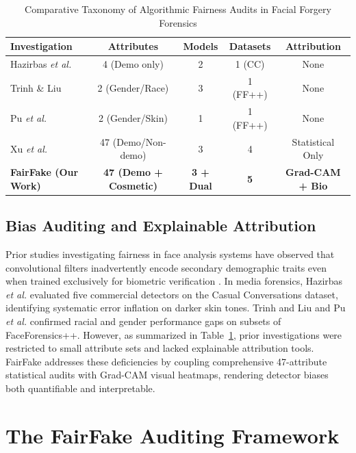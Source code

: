 \documentclass[journal]{IEEEtran}
\begin{document}
\begin{table}[t]
\caption{Comparative Taxonomy of Algorithmic Fairness Audits in Facial Forgery Forensics}
\label{tab:comparison_bias}
\centering
\renewcommand{\arraystretch}{1.2}
\setlength{\tabcolsep}{5pt}
\begin{tabular}{lcccc}
\toprule
\textbf{Investigation} & \textbf{Attributes} & \textbf{Models} & \textbf{Datasets} & \textbf{Attribution} \\
\midrule
Hazirbas \textit{et al.} \cite{hazirbas2022towards} & 4 (Demo only) & 2 & 1 (CC) & None \\
Trinh \& Liu \cite{trinh2021examination} & 2 (Gender/Race) & 3 & 1 (FF++) & None \\
Pu \textit{et al.} \cite{pu2022fairness} & 2 (Gender/Skin) & 1 & 1 (FF++) & None \\
Xu \textit{et al.} \cite{xu2024analyzing} & 47 (Demo/Non-demo) & 3 & 4 & Statistical Only \\
\textbf{FairFake (Our Work)} & \textbf{47 (Demo + Cosmetic)} & \textbf{3 + Dual} & \textbf{5} & \textbf{Grad-CAM + Bio} \\
\bottomrule
\end{tabular}
\end{table}

\subsection{Bias Auditing and Explainable Attribution}
Prior studies investigating fairness in face analysis systems have observed that convolutional filters inadvertently encode secondary demographic traits even when trained exclusively for biometric verification \cite{terhorst2022comprehensive, mehrabi2021survey, du2021fairness}. In media forensics, Hazirbas \textit{et al.} \cite{hazirbas2022towards} evaluated five commercial detectors on the Casual Conversations dataset, identifying systematic error inflation on darker skin tones. Trinh and Liu \cite{trinh2021examination} and Pu \textit{et al.} \cite{pu2022fairness} confirmed racial and gender performance gaps on subsets of FaceForensics++. However, as summarized in Table~\ref{tab:comparison_bias}, prior investigations were restricted to small attribute sets and lacked explainable attribution tools. FairFake addresses these deficiencies by coupling comprehensive 47-attribute statistical audits with Grad-CAM visual heatmaps, rendering detector biases both quantifiable and interpretable.

\section{The FairFake Auditing Framework}
\label{sec:methodology}
\end{document}
